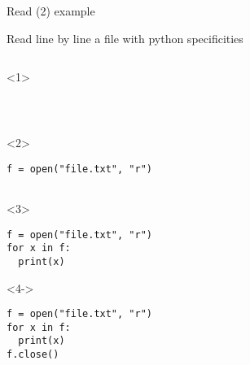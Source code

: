 
\begin{frame}[fragile]{Read (2) example}

  Read line by line a file with python specificities

  \begin{columns}[onlytextwidth]
    \begin{column}{\textwidth}

      \begin{onlyenv}<1>
        \begin{lstlisting}[style=python]



 \end{lstlisting}
      \end{onlyenv}

      \begin{onlyenv}<2>
        \begin{lstlisting}[style=python]
f = open("file.txt", "r")


 \end{lstlisting}
      \end{onlyenv}

      \begin{onlyenv}<3>
        \begin{lstlisting}[style=python]
f = open("file.txt", "r")
for x in f:
  print(x)
 \end{lstlisting}
      \end{onlyenv}

      \begin{onlyenv}<4->
        \begin{lstlisting}[style=python]
f = open("file.txt", "r")
for x in f:
  print(x)
f.close() \end{lstlisting}
      \end{onlyenv}

    \end{column}
  \end{columns}

\end{frame}



